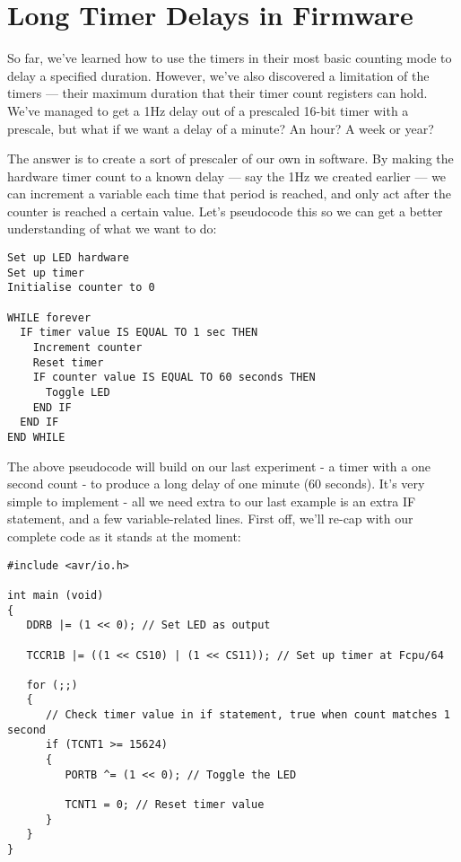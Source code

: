 \documentclass[a4paper,oneside,notitlepage]{book}
\begin{document}
\label{chp:LongFWDelays}
\chapter{Long Timer Delays in Firmware}

So far, we've learned how to use the timers in their most basic counting mode to delay a specified duration. However, we've also discovered a limitation of the timers --- their maximum duration that their timer count registers can hold. We've managed to get a 1Hz delay out of a prescaled 16-bit timer with a prescale, but what if we want a delay of a minute? An hour? A week or year?

The answer is to create a sort of prescaler of our own in software. By making the hardware timer count to a known delay --- say the 1Hz we created earlier --- we can increment a variable each time that period is reached, and only act after the counter is reached a certain value. Let's pseudocode this so we can get a better understanding of what we want to do:

\begin{center}
\begin{lstlisting}[keywordstyle=\color{black},commentstyle=\color{black}]
Set up LED hardware
Set up timer
Initialise counter to 0

WHILE forever
  IF timer value IS EQUAL TO 1 sec THEN
    Increment counter
    Reset timer
    IF counter value IS EQUAL TO 60 seconds THEN
      Toggle LED
    END IF
  END IF
END WHILE
\end{lstlisting}
\end{center}

The above pseudocode will build on our last experiment - a timer with a one second count - to produce a long delay of one minute (60 seconds). It's very simple to implement - all we need extra to our last example is an extra IF statement, and a few variable-related lines. First off, we'll re-cap with our complete code as it stands at the moment:

\begin{center}
\begin{lstlisting}
#include <avr/io.h>

int main (void)
{
   DDRB |= (1 << 0); // Set LED as output

   TCCR1B |= ((1 << CS10) | (1 << CS11)); // Set up timer at Fcpu/64

   for (;;)
   {
      // Check timer value in if statement, true when count matches 1 second
      if (TCNT1 >= 15624)
      {
         PORTB ^= (1 << 0); // Toggle the LED

         TCNT1 = 0; // Reset timer value
      }
   }
}
\end{lstlisting}
\end{center}
\end{document}

